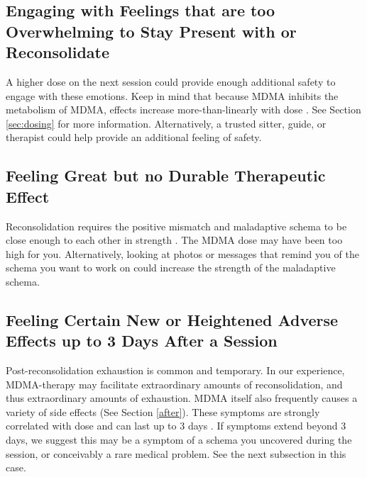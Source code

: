 \documentclass[12pt,letterpaper]{book}
\begin{document}
\subsection*{Engaging with Feelings that are too Overwhelming to Stay Present with or Reconsolidate}
A higher dose on the next session could provide enough additional safety to engage with these emotions. Keep in mind that because MDMA inhibits the metabolism of MDMA, effects increase more-than-linearly with dose \cite{de2000nonlinear}. See Section \ref{sec:dosing} for more information. Alternatively, a trusted sitter, guide, or therapist could help provide an additional feeling of safety.
\subsection*{Feeling Great but no Durable Therapeutic Effect}
Reconsolidation requires the positive mismatch and maladaptive schema to be close enough to each other in strength \cite{eckerUnlocking}. The MDMA dose may have been too high for you. Alternatively, looking at photos or messages that remind you of the schema you want to work on could increase the strength of the maladaptive schema.
\subsection*{Feeling Certain New or Heightened Adverse Effects up to 3 Days After a Session}
Post-reconsolidation exhaustion is common and temporary. In our experience, MDMA-therapy may facilitate extraordinary amounts of reconsolidation, and thus extraordinary amounts of exhaustion. MDMA itself also frequently causes a variety of side effects (See Section \ref{after}). These symptoms are strongly correlated with dose and can last up to 3 days \cite{liechtiGender}. If symptoms extend beyond 3 days, we suggest this may be a symptom of a schema you uncovered during the session, or conceivably a rare medical problem. See the next subsection in this case.
\end{document}
